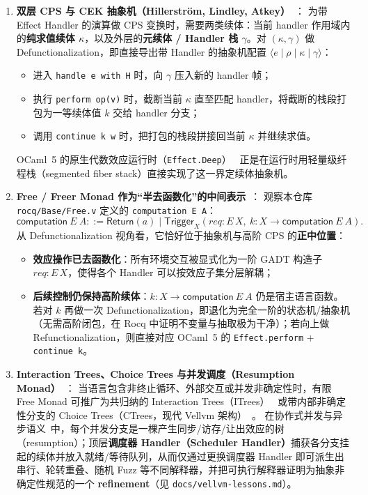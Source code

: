 \documentclass[UTF8,a4paper,11pt,fontset=fandol]{ctexart}
\newcommand{\code}[1]{\texttt{#1}}
\newcommand{\kw}[1]{\mathsf{#1}}
\begin{document}
\begin{enumerate}
\item \textbf{双层 CPS 与 CEK 抽象机（Hillerström, Lindley, Atkey）}~\cite{hillerstrom2017cps,hillerstrom2020generalised}：
  为带 Effect Handler 的演算做 CPS 变换时，需要两类续体：当前 handler 作用域内的\textbf{纯求值续体 $\kappa$}，以及外层的\textbf{元续体 / Handler 栈 $\gamma$}。对 $(\kappa, \gamma)$ 做 Defunctionalization，即直接导出带 Handler 的抽象机配置 $\langle e \mid \rho \mid \kappa \mid \gamma \rangle$：
  \begin{itemize}
  \item 进入 \code{handle e with H} 时，向 $\gamma$ 压入新的 handler 帧；
  \item 执行 \code{perform op(v)} 时，截断当前 $\kappa$ 直至匹配 handler，将截断的栈段打包为一等续体值 $k$ 交给 handler 分支；
  \item 调用 \code{continue k w} 时，把打包的栈段拼接回当前 $\kappa$ 并继续求值。
  \end{itemize}
  OCaml~5 的原生代数效应运行时（\code{Effect.Deep}）~\cite{sivaramakrishnan2021ocaml} 正是在运行时用轻量级纤程栈（segmented fiber stack）直接实现了这一界定续体抽象机。

\item \textbf{Free / Freer Monad 作为“半去函数化”的中间表示}~\cite{kiselyov2015freer}：
  观察本仓库 \code{rocq/Base/Free.v} 定义的 \code{computation E A}：
  \[
  \kw{computation}\ E\ A ::= \kw{Return}(a) \mid \kw{Trigger}_{X}(req : E\,X,\ k : X \to \kw{computation}\ E\ A).
  \]
  从 Defunctionalization 视角看，它恰好位于抽象机与高阶 CPS 的\textbf{正中位置}：
  \begin{itemize}
  \item \textbf{效应操作已去函数化}：所有环境交互被显式化为一阶 GADT 构造子 $req : E\,X$，使得各个 Handler 可以按效应子集分层解耦；
  \item \textbf{后续控制仍保持高阶续体}：$k : X \to \kw{computation}\ E\ A$ 仍是宿主语言函数。若对 $k$ 再做一次 Defunctionalization，即退化为完全一阶的状态机/抽象机（无需高阶闭包，在 Rocq 中证明不变量与抽取极为干净）；若向上做 Refunctionalization，则直接对应 OCaml~5 的 \code{Effect.perform} + \code{continue k}。
  \end{itemize}

\item \textbf{Interaction Trees、Choice Trees 与并发调度（Resumption Monad）}~\cite{xia2020itrees,chappe2023ctrees,ahman2021async}：
  当语言包含非终止循环、外部交互或并发非确定性时，有限 Free Monad 可推广为共归纳的 Interaction Trees（ITrees）~\cite{xia2020itrees} 或带内部非确定性分支的 Choice Trees（CTrees，现代 Vellvm 架构）~\cite{chappe2023ctrees}。
  在协作式并发与异步语义~\cite{ahman2021async}中，每个并发分支是一棵产生同步/访存/让出效应的树（resumption）；顶层\textbf{调度器 Handler（Scheduler Handler）}捕获各分支挂起的续体并放入就绪/等待队列，从而仅通过更换调度器 Handler 即可派生出串行、轮转重叠、随机 Fuzz 等不同解释器，并把可执行解释器证明为抽象非确定性规范的一个 \textbf{refinement}（见 \code{docs/vellvm-lessons.md}）。
\end{enumerate}
\end{document}
